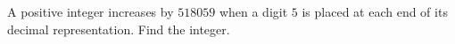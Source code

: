 A positive integer increases by $518059$ when a digit $5$ is placed at each end of its decimal representation. Find the integer.
